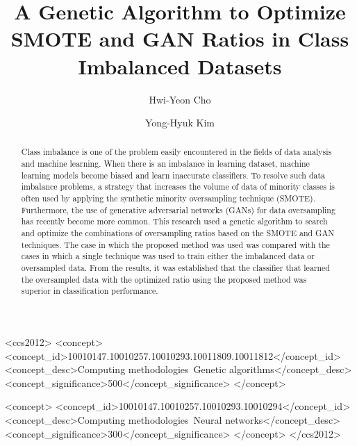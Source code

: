 \documentclass[sigconf]{acmart}
\begin{document}
\title{A Genetic Algorithm to Optimize SMOTE and GAN Ratios in Class Imbalanced Datasets}


\author{Hwi-Yeon Cho}

\author{Yong-Hyuk Kim}

\renewcommand{\shortauthors}{H.-Y. Cho et al.}


\begin{abstract}
    Class imbalance is one of the problem easily encountered in the fields of data analysis and machine learning.
    When there is an imbalance in learning dataset, machine learning models become biased and learn inaccurate classifiers.
    To resolve such data imbalance problems, a strategy that increases the volume of data of minority classes is often used by applying the synthetic minority oversampling technique (SMOTE).
    Furthermore, the use of generative adversarial networks (GANs) for data oversampling has recently become more common.
    This research used a genetic algorithm to search and optimize the combinations of oversampling ratios based on the SMOTE and GAN techniques.
    The case in which the proposed method was used was compared with the cases in which a single technique was used to train either the imbalanced data or oversampled data.
    From the results, it was established that the classifier that learned the oversampled data with the optimized ratio using the proposed method was superior in classification performance.
\end{abstract}


%
%
\begin{CCSXML}
    <ccs2012>
        <concept>
            <concept_id>10010147.10010257.10010293.10011809.10011812</concept_id>
            <concept_desc>Computing methodologies~Genetic algorithms</concept_desc>
            <concept_significance>500</concept_significance>
        </concept>

        <concept>
            <concept_id>10010147.10010257.10010293.10010294</concept_id>
            <concept_desc>Computing methodologies~Neural networks</concept_desc>
            <concept_significance>300</concept_significance>
        </concept>
    </ccs2012>
\end{CCSXML}
\end{document}
